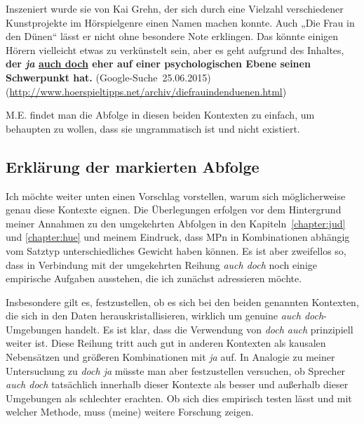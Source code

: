 \begin{exe}
	\ex\label{1194} 

	Inszeniert wurde sie von Kai Grehn, der sich durch eine Vielzahl verschiedener Kunstprojekte im Hörspielgenre einen Namen machen konnte. Auch „Die 	Frau in den Dünen“ lässt er nicht ohne besondere Note erklingen. Das könnte einigen Hörern vielleicht etwas zu verkünstelt sein, aber es geht 		aufgrund des Inhaltes, \textbf{der \textit{ja} \ul{auch doch} eher auf einer psychologischen Ebene seinen Schwerpunkt hat.}						
	\hfill\hbox{(Google-Suche 25.06.2015)}	
	\newline
	{\scriptsize(\url{http://www.hoerspieltipps.net/archiv/diefrauindenduenen.html})}
\end{exe}					            
M.E. findet man die Abfolge in diesen beiden Kontexten zu einfach, um behaupten zu wollen, dass sie ungrammatisch ist und nicht existiert.

\subsection{Erklärung der markierten Abfolge}
Ich möchte weiter unten einen Vorschlag vorstellen, warum sich möglicherweise genau diese Kontexte eignen. Die Überlegungen erfolgen vor dem Hintergrund meiner Annahmen zu den umgekehrten Abfolgen in den Kapiteln~\ref{chapter:jud} und \ref{chapter:hue} und meinem Eindruck, dass MPn in Kombinationen abhängig vom Satztyp unterschiedliches Gewicht haben können. Es ist aber zweifellos so, dass in Verbindung mit der umgekehrten Reihung \textit{auch doch} noch einige empirische Aufgaben ausstehen, die ich zunächst adressieren möchte.

Insbesondere gilt es, festzustellen, ob es sich bei den beiden genannten Kontexten, die sich in den Daten herauskristallisieren, wirklich um genuine \textit{auch doch}-Umgebungen handelt. Es ist klar, dass die Verwendung von \textit{doch auch} prinzi\-piell weiter ist. Diese Reihung tritt auch gut in anderen Kontexten als kausalen Nebensätzen und größeren Kombinationen mit \textit{ja} auf. In Analogie zu meiner Untersuchung zu \textit{doch ja} müsste man aber festzustellen versuchen, ob Sprecher \textit{auch doch} tatsächlich innerhalb dieser Kontexte als besser und außerhalb dieser Umgebungen als schlechter erachten. Ob sich dies empirisch testen lässt und mit welcher Methode, muss (meine) weitere Forschung zeigen.\largerpage[2]

